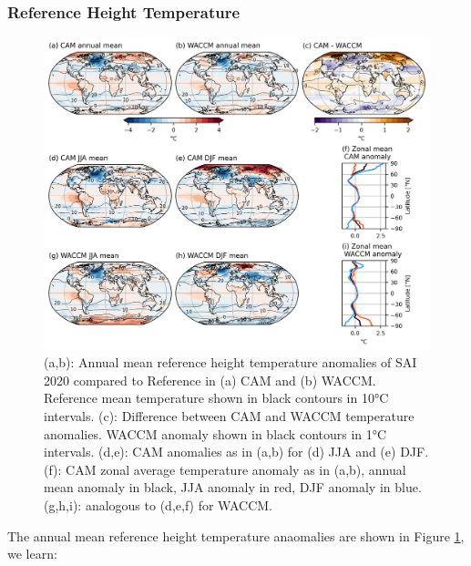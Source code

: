 \subsubsection{Reference Height Temperature}

\begin{figure}[H]
	\centering
	\includegraphics[width=\linewidth]{../Paper_imgs/TREFHT_20ref.png}
	\caption{(a,b): Annual mean reference height temperature anomalies of SAI 2020 compared to Reference in (a) CAM and (b) WACCM. Reference mean temperature shown in black contours in 10°C intervals. (c): Difference between CAM and WACCM temperature anomalies. WACCM anomaly shown in black contours in 1°C intervals. (d,e): CAM anomalies as in (a,b) for (d) JJA and (e) DJF. (f): CAM zonal average temperature anomaly as in (a,b), annual mean anomaly in black, JJA anomaly in red, DJF anomaly in blue. (g,h,i): analogous to (d,e,f) for WACCM.}
	\label{fig:TREFHT}
\end{figure} 

The annual mean reference height temperature anaomalies are shown in Figure \ref{fig:TREFHT}, we learn:

